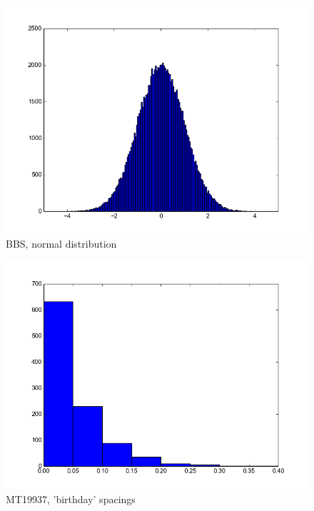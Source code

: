 \documentclass[reprint,aip]{revtex4-1}
\begin{document}
\begin{figure}[h]
\includegraphics{normal-bbs.png}
\caption{BBS, normal distribution}
\end{figure}

\begin{figure}[h]
\includegraphics{bday-mt19937.png}
\caption{MT19937, 'birthday' spacings}
\end{figure}
\end{document}
